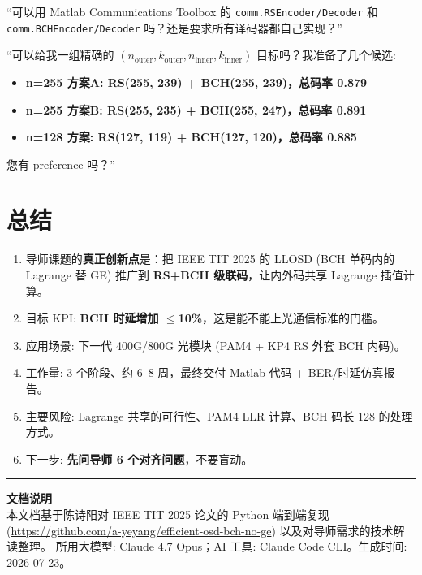 \documentclass[11pt,a4paper]{article}
\begin{document}
\begin{actionbox}[title=\textbf{Q5. Matlab 版本 \& Toolbox}]
``可以用 Matlab Communications Toolbox 的 \texttt{comm.RSEncoder/Decoder}
和 \texttt{comm.BCHEncoder/Decoder} 吗？还是要求所有译码器都自己实现？''
\end{actionbox}

\begin{actionbox}[title=\textbf{Q6. 具体参数}]
``可以给我一组精确的 $(n_{\text{outer}}, k_{\text{outer}}, n_{\text{inner}},
k_{\text{inner}})$ 目标吗？我准备了几个候选:

\begin{itemize}[leftmargin=1em, itemsep=1pt, topsep=1pt]
\item \bf n=255 方案A: RS(255, 239) + BCH(255, 239)，总码率 0.879
\item \bf n=255 方案B: RS(255, 235) + BCH(255, 247)，总码率 0.891
\item \bf n=128 方案: RS(127, 119) + BCH(127, 120)，总码率 0.885
\end{itemize}
您有 preference 吗？''
\end{actionbox}

\section{总结}

\begin{keybox}[title=\textbf{全文核心}]
\begin{enumerate}[leftmargin=1.5em, itemsep=2pt, topsep=2pt]
\item 导师课题的\textbf{真正创新点}是：把 IEEE TIT 2025 的 LLOSD (BCH 单码内的
Lagrange 替 GE) 推广到 \textbf{RS+BCH 级联码}，让内外码共享 Lagrange 插值计算。
\item 目标 KPI: \textbf{BCH 时延增加 $\leq$10\%}，这是能不能上光通信标准的门槛。
\item 应用场景: 下一代 400G/800G 光模块 (PAM4 + KP4 RS 外套 BCH 内码)。
\item 工作量: 3 个阶段、约 6--8 周，最终交付 Matlab 代码 + BER/时延仿真报告。
\item 主要风险: Lagrange 共享的可行性、PAM4 LLR 计算、BCH 码长 128 的处理方式。
\item 下一步: \textbf{先问导师 6 个对齐问题}，不要盲动。
\end{enumerate}
\end{keybox}

\vspace{6pt}
\hrule
\vspace{4pt}
\noindent\footnotesize{
\textbf{文档说明}\\
本文档基于陈诗阳对 IEEE TIT 2025 论文的 Python 端到端复现
(\url{https://github.com/a-yeyang/efficient-osd-bch-no-ge})
以及对导师需求的技术解读整理。
所用大模型: Claude 4.7 Opus；AI 工具: Claude Code CLI。生成时间: 2026-07-23。
}
\end{document}
